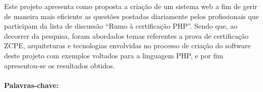 \begin{singlespace}
\noindent 
Este projeto apresenta como proposta a criação de um sistema web a fim de gerir
de maneira mais eficiente as questões postadas diariamente pelos
profissionais que participam da lista de discussão ``Rumo à certificação
PHP''. Sendo que, ao decorrer da pesquisa, foram abordados temas referentes a
prova de certificação \acs{ZCPE}, arquiteturas e tecnologias envolvidas no processo de 
criação do software deste projeto com exemplos voltados para a linguagem
\acs{PHP}, e por fim apresentou-se os resultados obtidos.\\\\
\textbf{Palavras-chave:} \textsf{\ptBRKeyword}
\end{singlespace}